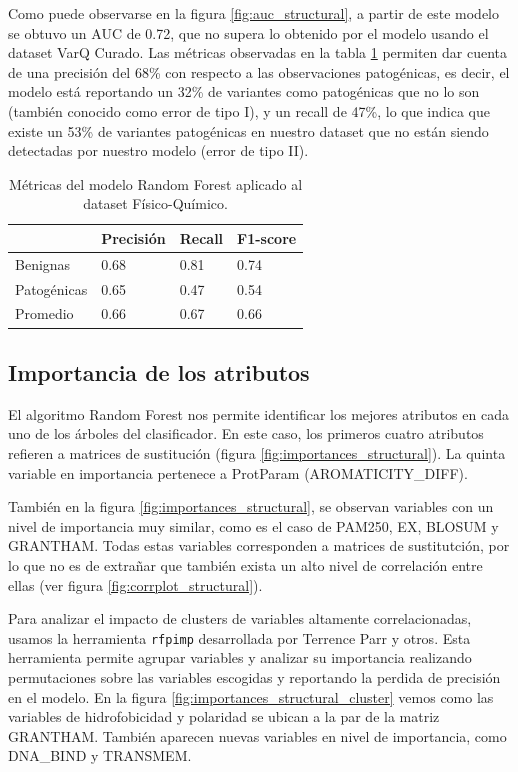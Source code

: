 Como puede observarse en la figura \ref{fig:auc_structural}, a partir de este modelo se obtuvo un AUC de 0.72, que no supera lo obtenido por el modelo usando el dataset VarQ Curado. Las métricas observadas en la tabla \ref{structural_table} permiten dar cuenta de una precisión del 68\% con respecto a las observaciones patogénicas, es decir, el modelo está reportando un 32\% de variantes como patogénicas que no lo son (también conocido como error de tipo I), y un recall de 47\%, lo que indica que existe un 53\% de variantes patogénicas en nuestro dataset que no están siendo detectadas por nuestro modelo (error de tipo II). 

\begin{table}[H]
\centering
\begin{tabular}{|l|l|l|l|}
\hline
              & Precisión & Recall & F1-score \\ \hline
Benignas      & 0.68      & 0.81   & 0.74     \\ \hline
Patogénicas   & 0.65      & 0.47   & 0.54     \\ \hline
Promedio      & 0.66      & 0.67   & 0.66     \\ \hline
\end{tabular}
\caption{Métricas del modelo Random Forest aplicado al dataset Físico-Químico.}
\label{structural_table}
\end{table}


\subsection{Importancia de los atributos}

El algoritmo Random Forest nos permite identificar los mejores atributos en cada uno de los árboles del clasificador. En este caso, los primeros cuatro atributos refieren a matrices de sustitución (figura \ref{fig:importances_structural}). La quinta variable en importancia pertenece a ProtParam (AROMATICITY\_DIFF). 

También en la figura \ref{fig:importances_structural}, se observan variables con un nivel de importancia muy similar, como es el caso de PAM250, EX, BLOSUM y GRANTHAM. Todas estas variables corresponden a matrices de sustitutción, por lo que no es de extrañar que también exista un alto nivel de correlación entre ellas (ver figura \ref{fig:corrplot_structural}). 

Para analizar el impacto de clusters de variables altamente correlacionadas, usamos la herramienta \texttt{rfpimp} desarrollada por Terrence Parr y otros. Esta herramienta permite agrupar variables y analizar su importancia realizando permutaciones sobre las variables escogidas y reportando la perdida de precisión en el modelo. En la figura \ref{fig:importances_structural_cluster} vemos como las variables de hidrofobicidad y polaridad se ubican a la par de la matriz GRANTHAM. También aparecen nuevas variables en nivel de importancia, como DNA\_BIND y TRANSMEM.


